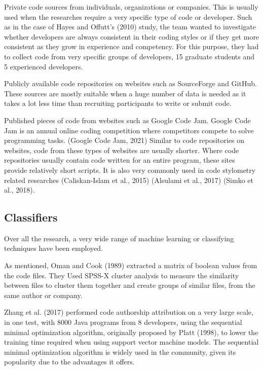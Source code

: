 \documentclass{report}
\begin{document}
Private code sources from individuals, organizations or companies. This is usually used when the researches require a very specific type of code or developer. Such as in the case of Hayes and Offutt’s (2010) study, the team wanted to investigate whether developers are always consistent in their coding styles or if they get more consistent as they grow in experience and competency. For this purpose, they had to collect code from very specific groups of developers, 15 graduate students and 5 experienced developers.

Publicly available code repositories on websites such as SourceForge and GitHub. These sources are mostly suitable when a huge number of data is needed as it takes a lot less time than recruiting participants to write or submit code.

Published pieces of code from websites such as Google Code Jam. Google Code Jam is an annual online coding competition where competitors compete to solve programming tasks. (Google Code Jam, 2021) Similar to code repositories on websites, code from these types of websites are usually shorter. Where code repositories usually contain code written for an entire program, these sites provide relatively short scripts. It is also very commonly used in code stylometry related researches (Caliskan-Islam et al., 2015) (Alsulami et al., 2017) (Simko et al., 2018).

\subsection{Classifiers}

Over all the research, a very wide range of machine learning or classifying techniques have been employed.

As mentioned, Oman and Cook (1989) extracted a matrix of boolean values from the code files. They Used SPSS-X cluster analysis to measure the similarity between files to cluster them together and create groups of similar files, from the same author or company.

Zhang et al. (2017) performed code authorship attribution on a very large scale, in one test, with 8000 Java programs from 8 developers, using the sequential minimal optimization algorithm, originally proposed by Platt (1998), to lower the training time required when using support vector machine models. The sequential minimal optimization algorithm is widely used in the community, given its popularity due to the advantages it offers.
\end{document}

